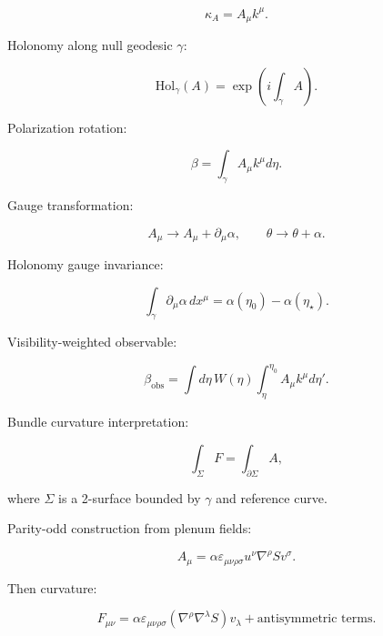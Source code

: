 \documentclass[12pt]{article}
\begin{document}
\begin{equation}
\kappa_A = A_\mu k^\mu.
\end{equation}

Holonomy along null geodesic $\gamma$:

\begin{equation}
\mathrm{Hol}_\gamma(A)
=
\exp
\left(
i \int_\gamma A
\right).
\end{equation}

Polarization rotation:

\begin{equation}
\beta = \int_\gamma A_\mu k^\mu d\eta.
\end{equation}

Gauge transformation:

\begin{equation}
A_\mu \to A_\mu + \partial_\mu \alpha,
\qquad
\theta \to \theta + \alpha.
\end{equation}

Holonomy gauge invariance:

\begin{equation}
\int_\gamma \partial_\mu \alpha \, dx^\mu
=
\alpha(\eta_0) - \alpha(\eta_\star).
\end{equation}

Visibility-weighted observable:

\begin{equation}
\beta_{\mathrm{obs}}
=
\int d\eta \,
W(\eta)
\int_{\eta}^{\eta_0}
A_\mu k^\mu d\eta'.
\end{equation}

Bundle curvature interpretation:

\begin{equation}
\int_\Sigma F
=
\int_{\partial \Sigma} A,
\end{equation}

where $\Sigma$ is a 2-surface bounded by $\gamma$ and reference curve.

Parity-odd construction from plenum fields:

\begin{equation}
A_\mu
=
\alpha
\varepsilon_{\mu\nu\rho\sigma}
u^\nu
\nabla^\rho S
v^\sigma.
\end{equation}

Then curvature:

\begin{equation}
F_{\mu\nu}
=
\alpha
\varepsilon_{\mu\nu\rho\sigma}
\left(
\nabla^\rho \nabla^\lambda S
\right)
v_\lambda
+
\text{antisymmetric terms}.
\end{equation}
\end{document}
